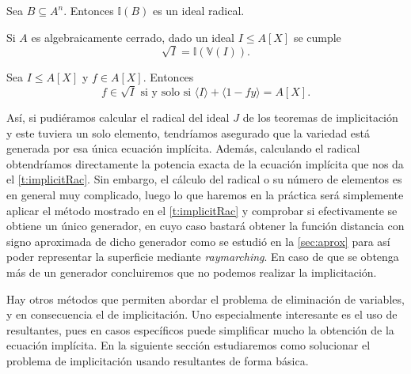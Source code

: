 \begin{proposicion}
    Sea $B\subseteq A^n$. Entonces $\mathbb{I}(B)$ es un ideal radical.
\end{proposicion}
\begin{teorema}
    Si $A$ es algebraicamente cerrado, dado un ideal $I\le A[X]$ se cumple
    \begin{equation*}
        \sqrt{I} = \mathbb{I}(\mathbb{V}(I)).
    \end{equation*}
\end{teorema}
\begin{proposicion}
    Sea $I\le A[X]$ y $f\in A[X]$. Entonces
    \begin{equation*}
        f\in \sqrt{I} \text{ si y solo si } \langle I \rangle + \langle 1-fy \rangle = A[X].
    \end{equation*}
\end{proposicion}
Así, si pudiéramos calcular el radical del ideal $J$ de los teoremas de implicitación y este tuviera un solo elemento, tendríamos asegurado que la variedad está generada por esa única ecuación implícita. Además, calculando el radical obtendríamos directamente la potencia exacta de la ecuación implícita que nos da el \autoref{t:implicitRac}. Sin embargo, el cálculo del radical o su número de elementos es en general muy complicado, luego lo que haremos en la práctica será simplemente aplicar el método mostrado en el \autoref{t:implicitRac} y comprobar si efectivamente se obtiene un único generador, en cuyo caso bastará obtener la función distancia con signo aproximada de dicho generador como se estudió en la \autoref{sec:aprox} para así poder representar la superficie mediante \textit{raymarching}. En caso de que se obtenga más de un generador concluiremos que no podemos realizar la implicitación.\newline

Hay otros métodos que permiten abordar el problema de eliminación de variables, y en consecuencia el de implicitación. Uno especialmente interesante es el uso de resultantes, pues en casos específicos puede simplificar mucho la obtención de la ecuación implícita. En la siguiente sección estudiaremos como solucionar el problema de implicitación usando resultantes de forma básica.
